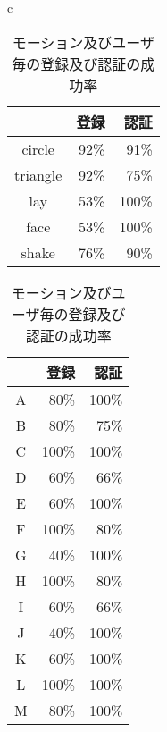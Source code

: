 \begin{table}[htbp]
    \centering
    \caption{モーション及びユーザ毎の登録及び認証の成功率}
    \begin{tabular}{c}
        \begin{minipage}{0.46\hsize}
            \centering
            \begin{tabular}{|c|r|r|} \hline
                & 登録 & 認証 \\ \hline
                circle & 92\% & 91\% \\ \hline
                triangle & 92\%  & 75\% \\ \hline
                lay & 53\% & 100\% \\ \hline
                face & 53\% & 100\% \\ \hline
                shake & 76\% & 90\% \\ \hline
            \end{tabular}
        \end{minipage}
        \begin{minipage}{0.46\hsize}
            \centering
            \begin{tabular}{|c|r|r|} \hline
                & 登録 & 認証 \\ \hline
                A & 80\% & 100\% \\ \hline
                B & 80\% & 75\% \\ \hline
                C & 100\% & 100\% \\ \hline
                D & 60\% & 66\% \\ \hline
                E & 60\% & 100\% \\ \hline
                F & 100\% & 80\% \\ \hline
                G & 40\% & 100\% \\ \hline
                H & 100\% & 80\% \\ \hline
                I & 60\% & 66\% \\ \hline
                J & 40\% & 100\% \\ \hline
                K & 60\% & 100\% \\ \hline
                L & 100\% & 100\% \\ \hline
                M & 80\% & 100\% \\ \hline
            \end{tabular}
        \end{minipage}
    \end{tabular}
    \label{test}
\end{table}

